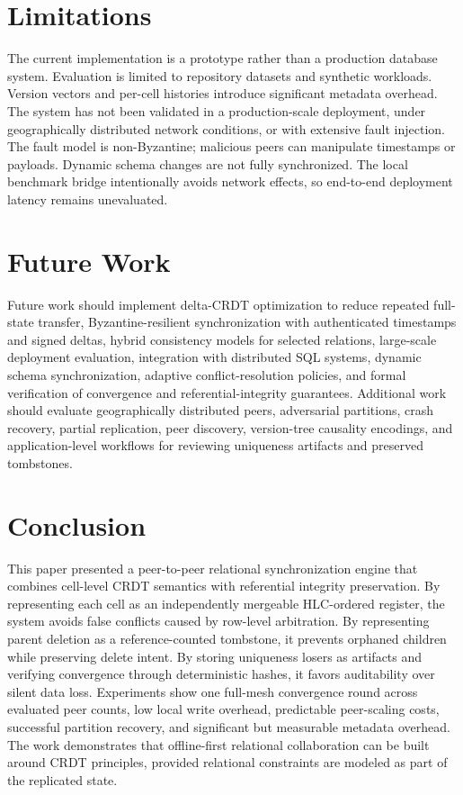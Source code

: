 \documentclass[pdflatex,sn-mathphys-num]{sn-jnl}
\begin{document}
\section{Limitations}

The current implementation is a prototype rather than a production database system. Evaluation is limited to repository datasets and synthetic workloads. Version vectors and per-cell histories introduce significant metadata overhead. The system has not been validated in a production-scale deployment, under geographically distributed network conditions, or with extensive fault injection. The fault model is non-Byzantine; malicious peers can manipulate timestamps or payloads. Dynamic schema changes are not fully synchronized. The local benchmark bridge intentionally avoids network effects, so end-to-end deployment latency remains unevaluated.

\section{Future Work}

Future work should implement delta-CRDT optimization to reduce repeated full-state transfer, Byzantine-resilient synchronization with authenticated timestamps and signed deltas, hybrid consistency models for selected relations, large-scale deployment evaluation, integration with distributed SQL systems, dynamic schema synchronization, adaptive conflict-resolution policies, and formal verification of convergence and referential-integrity guarantees. Additional work should evaluate geographically distributed peers, adversarial partitions, crash recovery, partial replication, peer discovery, version-tree causality encodings, and application-level workflows for reviewing uniqueness artifacts and preserved tombstones.

\section{Conclusion}

This paper presented a peer-to-peer relational synchronization engine that combines cell-level CRDT semantics with referential integrity preservation. By representing each cell as an independently mergeable HLC-ordered register, the system avoids false conflicts caused by row-level arbitration. By representing parent deletion as a reference-counted tombstone, it prevents orphaned children while preserving delete intent. By storing uniqueness losers as artifacts and verifying convergence through deterministic hashes, it favors auditability over silent data loss. Experiments show one full-mesh convergence round across evaluated peer counts, low local write overhead, predictable peer-scaling costs, successful partition recovery, and significant but measurable metadata overhead. The work demonstrates that offline-first relational collaboration can be built around CRDT principles, provided relational constraints are modeled as part of the replicated state.
\end{document}
